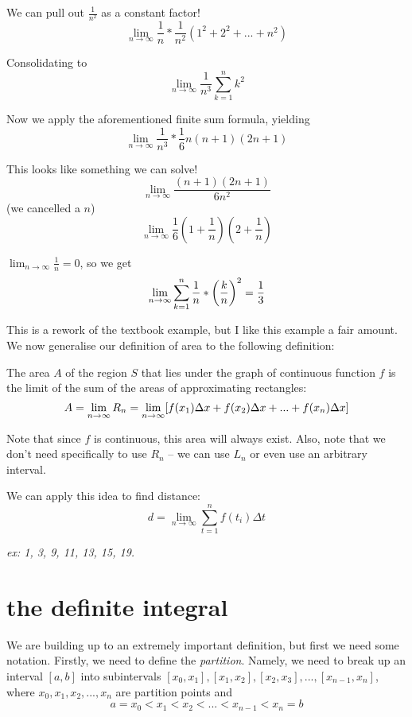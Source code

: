 \documentclass[10pt,a4paper]{report}
\begin{document}
We can pull out $\frac{1}{n^2}$ as a constant factor!
$$
	\lim_{n \to \infty} \frac{1}{n} * \frac{1}{n^2} (1^2 + 2^2 + ... + n^2)
$$

Consolidating to
$$
	\lim_{n \to \infty} \frac{1}{n^3} \displaystyle\sum_{k = 1}^{n} k^2
$$

Now we apply the aforementioned finite sum formula, yielding
$$
	\lim_{n \to \infty} \frac{1}{n^3} * \frac{1}{6} n(n+1)(2n+1)
$$

This looks like something we can solve!
$$
	\lim_{n \to \infty} \frac{(n+1)(2n+1)}{6n^2}
$$
(we cancelled a $n$)
$$
	\lim_{n \to \infty} \frac{1}{6} \left( 1 + \frac{1}{n} \right) \left( 2 + \frac{1}{n} \right)
$$

$\lim_{n \to \infty} \frac{1}{n} = 0$, so we get
$$
	\lim_{n \to \infty} \displaystyle\sum_{k = 1}^{n} \frac{1}{n} * \left(\frac{k}{n} \right)^2 = \\
	\frac{1}{3}
$$

This is a rework of the textbook example, but I like this example a fair amount. We now generalise our definition of area to the following definition:

The area $A$ of the region $S$ that lies under the graph of continuous function $f$ is the limit of the sum of the areas of approximating rectangles:
$$
	A = \lim_{n \to \infty} R_n = \lim_{n \to \infty} [f(x_1) \Delta x + f(x_2) \Delta x + ... + \\
	f(x_n) \Delta x ]
$$

Note that since $f$ is continuous, this area will always exist. Also, note that we don't need specifically to use $R_n$ -- we can use $L_n$ or even use an arbitrary interval.

We can apply this idea to find distance:
$$
	d = \lim_{n \to \infty} \displaystyle\sum_{t = 1}^{n} f(t_i) \Delta t
$$

\emph{ex: 1, 3, 9, 11, 13, 15, 19.}

\section{the definite integral}

We are building up to an extremely important definition, but first we need some notation. Firstly, we need to define the \emph{partition}. Namely, we need to break up an interval $[a, b]$ into subintervals $[x_0, x_1],  [x_1, x_2], [x_2, x_3], ..., [x_{n-1}, x_n]$, where $x_0, x_1, x_2, ..., x_n$ are partition points and 
$$a = x_0 < x_1 < x_2 < ... < x_{n - 1} < x_n = b$$
\end{document}
